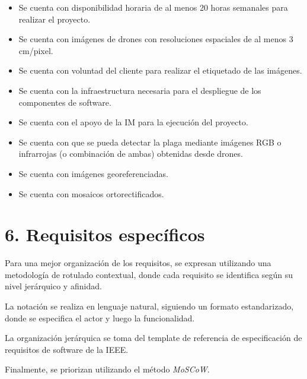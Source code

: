 \documentclass[
11pt, %
]{charter}
\begin{document}
\begin{itemize}

  \item Se cuenta con disponibilidad horaria de al menos 20 horas semanales para realizar el proyecto.
  \item Se cuenta con imágenes de drones con resoluciones espaciales de al menos 3 cm/pixel.
  \item Se cuenta con voluntad del cliente para realizar el etiquetado de las imágenes.
  \item Se cuenta con la infraestructura necesaria para el despliegue de los componentes de software.
  \item Se cuenta con el apoyo de la IM para la ejecución del proyecto.
  \item Se cuenta con que se pueda detectar la plaga mediante imágenes RGB o infrarrojas (o combinación de ambas) obtenidas desde drones.
  \item Se cuenta con imágenes georeferenciadas.
  \item Se cuenta con mosaicos ortorectificados.

\end{itemize}

\section{6. Requisitos específicos}
\label{sec:requisitos}

Para una mejor organización de los requisitos, se expresan utilizando una metodología de rotulado contextual, donde cada requisito se identifica según su nivel jerárquico y afinidad.

La notación se realiza en lenguaje natural, siguiendo un formato estandarizado, donde se especifica el actor y luego la funcionalidad.

La organización jerárquica se toma del template de referencia de especificación de requisitos de software de la IEEE.

Finalmente, se priorizan utilizando el método \textit{MoSCoW}.
\end{document}
